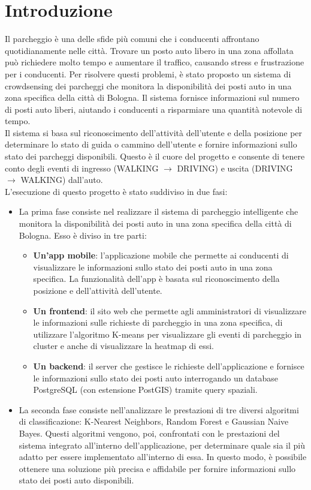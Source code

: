\documentclass[../../Report.tex]{subfiles}
\begin{document}
    \chapter{Introduzione}
    Il parcheggio è una delle sfide più comuni che i conducenti affrontano quotidianamente nelle città. Trovare un posto auto libero in una zona affollata può richiedere molto tempo e aumentare il traffico, causando stress e frustrazione per i conducenti. Per risolvere questi problemi, è stato proposto un sistema di crowdsensing dei parcheggi che monitora la disponibilità dei posti auto in una zona specifica della città di Bologna. Il sistema fornisce informazioni sul numero di posti auto liberi, aiutando i conducenti a risparmiare una quantità notevole di tempo.\\
    Il sistema si basa sul riconoscimento dell'attività dell'utente e della posizione per determinare lo stato di guida o cammino dell'utente e fornire informazioni sullo stato dei parcheggi disponibili. Questo è il cuore del progetto e consente di tenere conto degli eventi di ingresso (WALKING $\rightarrow$ DRIVING) e uscita (DRIVING $\rightarrow$ WALKING) dall'auto.\\
    L'esecuzione di questo progetto è stato suddiviso in due fasi:
    \begin{itemize}
        \item La prima fase consiste nel realizzare il sistema di parcheggio intelligente che monitora la disponibilità dei posti auto in una zona specifica della città di Bologna. Esso è diviso in tre parti:
        \begin{itemize}
            \item \textbf{Un'app mobile}: l'applicazione mobile che permette ai conducenti di visualizzare le informazioni sullo stato dei posti auto in una zona specifica. La funzionalità dell'app è basata sul riconoscimento della posizione e dell'attività dell'utente.
            \item \textbf{Un frontend}: il sito web che permette agli amministratori di visualizzare le informazioni sulle richieste di parcheggio in una zona specifica, di utilizzare l'algoritmo K-means per visualizzare gli eventi di parcheggio in cluster e anche di visualizzare la heatmap di essi.
            \item \textbf{Un backend}: il server che gestisce le richieste dell'applicazione e fornisce le informazioni sullo stato dei posti auto interrogando un database PostgreSQL (con estensione PostGIS) tramite query spaziali.
        \end{itemize}
        \item La seconda fase consiste nell'analizzare le prestazioni di tre diversi algoritmi di classificazione: K-Nearest Neighbors, Random Forest e Gaussian Naive Bayes. Questi algoritmi vengono, poi, confrontati con le prestazioni del sistema integrato all'interno dell'applicazione, per determinare quale sia il più adatto per essere implementato all'interno di essa. In questo modo, è possibile ottenere una soluzione più precisa e affidabile per fornire informazioni sullo stato dei posti auto disponibili. 
    \end{itemize}
\end{document}
